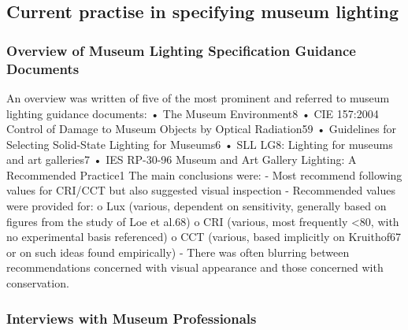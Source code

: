 \subsection{Current practise in specifying museum lighting}

\subsubsection{Overview of Museum Lighting Specification Guidance Documents}

An overview was written of five of the most prominent and referred to museum lighting guidance documents:
•	The Museum Environment8
•	CIE 157:2004 Control of Damage to Museum Objects by Optical Radiation59
•	Guidelines for Selecting Solid-State Lighting for Museums6
•	SLL LG8: Lighting for museums and art galleries7
•	IES RP-30-96 Museum and Art Gallery Lighting: A Recommended Practice1
The main conclusions were:
-	Most recommend following values for CRI/CCT but also suggested visual inspection 
-	Recommended values were provided for:
o	Lux (various, dependent on sensitivity, generally based on figures from the study of Loe et al.68)
o	CRI (various, most frequently <80, with no experimental basis referenced)
o	CCT (various, based implicitly on Kruithof67 or on such ideas found empirically)
-	There was often blurring between recommendations concerned with visual appearance and those concerned with conservation. 

\subsubsection{Interviews with Museum Professionals}

